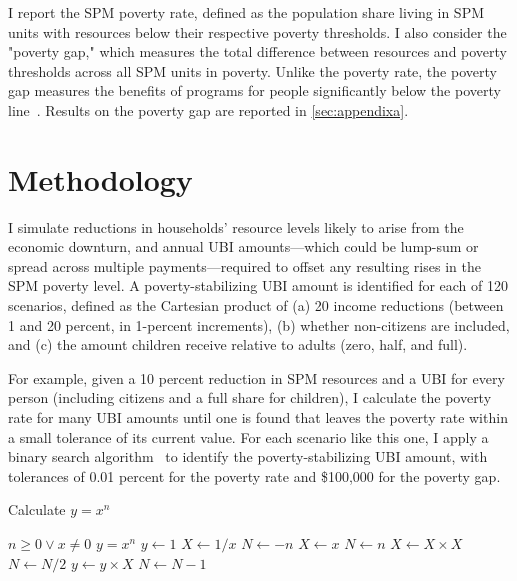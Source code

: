 \documentclass[12pt]{article}
\begin{document}
I report the SPM poverty rate, defined as the population share living in SPM units with resources below their respective poverty thresholds. I also consider the "poverty gap," which measures the total difference between resources and poverty thresholds across all SPM units in poverty. Unlike the poverty rate, the poverty gap measures the benefits of programs for people significantly below the poverty line~\cite{bruenig}. Results on the poverty gap are reported in \autoref{sec:appendixa}.


\section{Methodology} \label{sec:methodology}

I simulate reductions in households' resource levels likely to arise from the economic downturn, and annual UBI amounts---which could be lump-sum or spread across multiple payments---required to offset any resulting rises in the SPM poverty level. A poverty-stabilizing UBI amount is identified for each of 120 scenarios, defined as the Cartesian product of (a) 20 income reductions (between 1 and 20 percent, in 1-percent increments), (b) whether non-citizens are included, and (c) the amount children receive relative to adults (zero, half, and full).

For example, given a 10 percent reduction in SPM resources and a UBI for every person (including citizens and a full share for children), I calculate the poverty rate for many UBI amounts until one is found that leaves the poverty rate within a small tolerance of its current value. For each scenario like this one, I apply a binary search algorithm~\cite{binary_search} to identify the poverty-stabilizing UBI amount, with tolerances of 0.01 percent for the poverty rate and \$100,000 for the poverty gap.

\begin{algorithm}
	\caption{Calculate $y = x^n$}
	\begin{algorithmic}
		\REQUIRE $n \geq 0 \vee x \neq 0$
		\ENSURE $y = x^n$
		\STATE $y \leftarrow 1$
		\STATE $X \leftarrow 1 / x$
		\STATE $N \leftarrow -n$
		\ELSE
		\STATE $X \leftarrow x$
		\STATE $N \leftarrow n$
		\ENDIF
		\STATE $X \leftarrow X \times X$
		\STATE $N \leftarrow N / 2$
		\ELSE[$N$ is odd]
		\STATE $y \leftarrow y \times X$
		\STATE $N \leftarrow N - 1$
		\ENDIF
		\ENDWHILE
	\end{algorithmic}
\end{algorithm}
\end{document}
